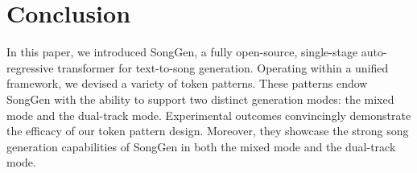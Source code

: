 \vspace{-10pt}
\section{Conclusion}
In this paper, we introduced SongGen, a fully open-source, single-stage auto-regressive transformer for text-to-song generation. Operating within a unified framework, we devised a variety of token patterns. These patterns endow SongGen with the ability to support two distinct generation modes: the mixed mode and the dual-track mode. Experimental outcomes convincingly demonstrate the efficacy of our token pattern design. Moreover, they showcase the strong song generation capabilities of SongGen in both the mixed mode and the dual-track mode.